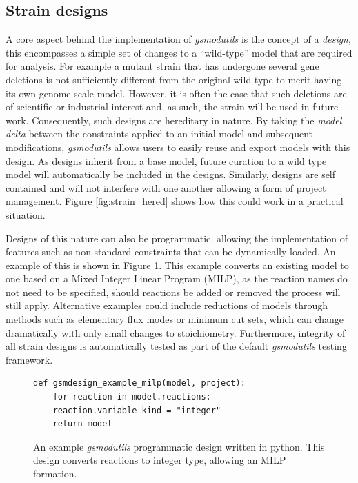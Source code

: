 \documentclass[journal=asbcd6]{achemso}
\begin{document}
\subsection{Strain designs}
A core aspect behind the implementation of \textit{gsmodutils} is the concept of a \textit{design}, this encompasses a simple set of changes to a ``wild-type'' model that are required for analysis.
For example a mutant strain that has undergone several gene deletions is not sufficiently different from the original wild-type to merit having its own genome scale model.
However, it is often the case that such deletions are of scientific or industrial interest and, as such, the strain will be used in future work.
Consequently, such designs are hereditary in nature.
By taking the \textit{model delta} between the constraints applied to an initial model and subsequent modifications, \textit{gsmodutils} allows users to easily reuse and export models with this design.
As designs inherit from a base model, future curation to a wild type model will automatically be included in the designs.
Similarly, designs are self contained and will not interfere with one another allowing a form of project management.
Figure \ref{fig:strain_hered} shows how this could work in a practical situation.

Designs of this nature can also be programmatic, allowing the implementation of features such as non-standard constraints that can be dynamically loaded.
An example of this is shown in Figure \ref{fig:programmatic_design}.
This example converts an existing model to one based on a Mixed Integer Linear Program (MILP), as the reaction names do not need to be specified, should reactions be added or removed the process will still apply.
Alternative examples could include reductions of models through methods such as elementary flux modes or minimum cut sets, which can change dramatically with only small changes to stoichiometry.
Furthermore, integrity of all strain designs is automatically tested as part of the default \textit{gsmodutils} testing framework.

\begin{figure}[ht]
\lstset{language=python}   
\begin{lstlisting}
def gsmdesign_example_milp(model, project):
    for reaction in model.reactions:
	reaction.variable_kind = "integer"
    return model
\end{lstlisting}
\caption{An example \textit{gsmodutils} programmatic design written in python. 
This design converts reactions to integer type, allowing an MILP formation.}
\label{fig:programmatic_design} 
\end{figure}
\end{document}
